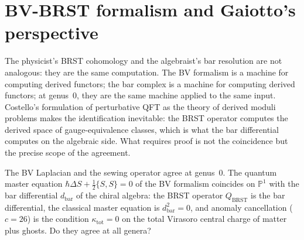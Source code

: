 \chapter{BV-BRST formalism and Gaiotto's perspective}
\label{ch:bv-brst}

The physicist's BRST cohomology and the algebraist's bar resolution
are not analogous: they are the same computation. The BV formalism
is a machine for computing derived functors; the bar complex is a
machine for computing derived functors; at genus~$0$, they are the
same machine applied to the same input. Costello's formulation of
perturbative QFT as the theory of derived moduli problems makes the
identification inevitable: the BRST operator computes the derived
space of gauge-equivalence classes, which is what the bar differential
computes on the algebraic side. What requires proof is not the
coincidence but the precise scope of the agreement.

The BV Laplacian and the sewing operator agree at genus~$0$. The
quantum master equation $\hbar \Delta S + \tfrac12\{S,S\} = 0$ of
the BV formalism coincides on $\mathbb{P}^1$ with the bar
differential $d_{\mathrm{bar}}$ of the chiral algebra: the
BRST operator $Q_{\mathrm{BRST}}$ is the bar differential, the
classical master equation is $d_{\mathrm{bar}}^2 = 0$, and anomaly
cancellation ($c = 26$) is the condition $\kappa_{\mathrm{tot}} = 0$
on the total Virasoro central charge of matter plus ghosts. Do
they agree at all genera?

